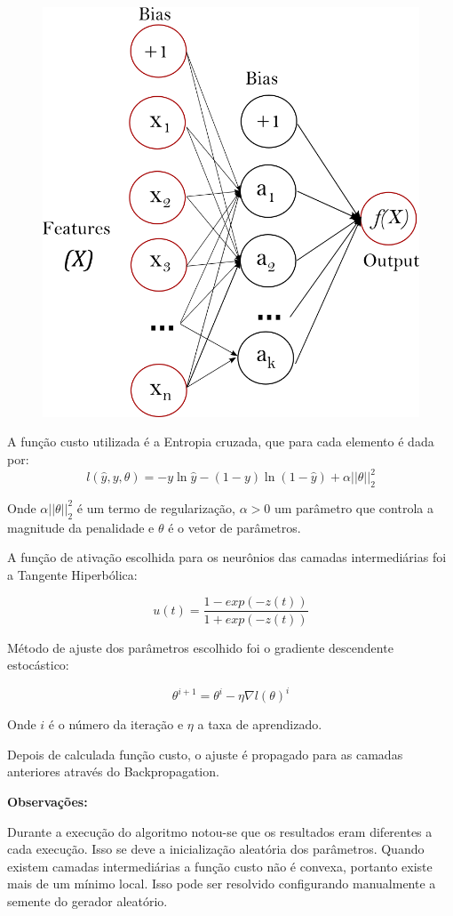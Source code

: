 \documentclass[11pt,a4paper]{article}
\numberwithin{equation}{section}
\begin{document}
\begin{figure}[H]
\centering
  \includegraphics[width=0.43\linewidth]{../img/multilayerperceptron_network.png}
  \label{fig:percep}
\end{figure}%


A função custo utilizada é a Entropia cruzada, que para cada elemento é dada por:
\[l(\hat{y},y,\theta) = -y \ln{\hat{y}} - (1-y) \ln{(1 - \hat{y})} + \alpha ||\theta||_2^2\]

Onde $\alpha ||\theta||_2^2$ é um termo de regularização, $\alpha > 0$ um parâmetro que controla a magnitude da penalidade e $\theta$ é o vetor de parâmetros.

A função de ativação escolhida para os neurônios das camadas intermediárias foi a Tangente Hiperbólica:

\[ u(t) = \frac{1- exp(-z(t))}{1+exp(-z(t))}\]

 Método de ajuste dos parâmetros escolhido foi o gradiente descendente estocástico:

\[\theta^{i+1} = \theta^i - \eta \nabla {l}({\theta})^{i}\]

Onde $i$ é o número da iteração e $\eta$ a taxa de aprendizado. 

Depois de calculada função custo, o ajuste é propagado para as camadas anteriores através do Backpropagation.


\textbf{Observações:}

Durante a execução do algoritmo notou-se que os resultados eram diferentes a cada execução. Isso se deve a inicialização aleatória dos parâmetros. Quando existem camadas intermediárias a função custo não é convexa, portanto existe mais de um mínimo local. Isso pode ser resolvido configurando manualmente a semente do gerador aleatório.
\end{document}
